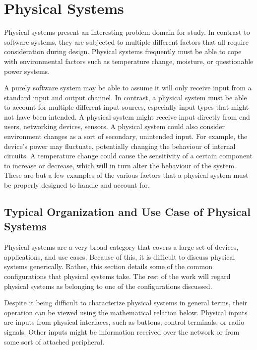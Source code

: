 
\chapter{Physical Systems}
\label{chapter:physicalsystems}

Physical systems present an interesting problem domain for study. In contrast to software systems,
they are subjected to multiple different factors that all require consideration during design. Physical
systems frequently must be able to cope with environmental factors such as temperature change, moisture,
or questionable power systems. 

A purely software system may be able to assume it will only receive input from a standard input and output
channel. In contrast, a physical system must be able
to account for multiple different input sources, especially input types that might not have been intended. 
A physical system might receive input directly from end users, networking devices, sensors. A physical
system could also consider environment changes as a sort of secondary, unintended input. For example,
the device's power may fluctuate, potentially changing the behaviour of internal circuits. A temperature change
could cause the sensitivity of a certain component to increase or decrease, which will in turn alter the behaviour
of the system. These are but a few examples of the various factors that a physical system must be properly
designed to handle and account for.

\section{Typical Organization and Use Case of Physical Systems}
Physical systems are a very broad category that covers a large set of devices, applications, and use cases.
Because of this, it is difficult to discuss physical systems generically. Rather, this section details some
of the common configurations that physical systems take. The rest of the work will regard physical systems as
belonging to one of the configurations discussed.

Despite it being difficult to characterize physical systems in general terms, their operation can be viewed using the mathematical
relation below. Physical inputs are inputs from physical interfaces, such as buttons, control terminals, or radio signals. Other
inputs might be information received over the network or from some sort of attached peripheral.

